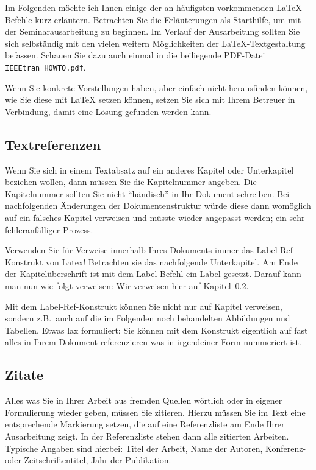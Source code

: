 \documentclass[a4paper,twoside]{IEEEtran}
\begin{document}
Im Folgenden möchte ich Ihnen einige der an häufigsten vorkommenden LaTeX-Befehle kurz erläutern. Betrachten Sie die Erläuterungen als Starthilfe, um mit der Seminarausarbeitung zu beginnen. Im Verlauf der Ausarbeitung sollten Sie sich selbständig mit den vielen weitern Möglichkeiten der LaTeX-Textgestaltung befassen. Schauen Sie dazu auch einmal in die beiliegende PDF-Datei \texttt{IEEEtran\_HOWTO.pdf}.

Wenn Sie konkrete Vorstellungen haben, aber einfach nicht herausfinden können, wie Sie diese mit LaTeX setzen können, setzen Sie sich mit Ihrem Betreuer in Verbindung, damit eine Lösung gefunden werden kann.


\subsection{Textreferenzen}

Wenn Sie sich in einem Textabsatz auf ein anderes Kapitel oder Unterkapitel beziehen wollen, dann müssen Sie die Kapitelnummer angeben. Die Kapitelnummer sollten Sie nicht "`händisch"' in Ihr Dokument schreiben. Bei nachfolgenden Änderungen der Dokumentenstruktur würde diese dann womöglich auf ein falsches Kapitel verweisen und müsste wieder angepasst werden; ein sehr fehleranfälliger Prozess.

Verwenden Sie für Verweise innerhalb Ihres Dokuments immer das Label-Ref-Konstrukt von Latex! Betrachten sie das nachfolgende Unterkapitel. Am Ende der Kapitelüberschrift ist mit dem Label-Befehl ein Label gesetzt. Darauf kann man nun wie folgt verweisen: Wir verweisen hier auf Kapitel~\ref{mein_erstes_label}.

Mit dem Label-Ref-Konstrukt können Sie nicht nur auf Kapitel verweisen, sondern z.B.\ auch auf die im Folgenden noch behandelten Abbildungen und Tabellen. Etwas lax formuliert: Sie können mit dem Konstrukt eigentlich auf fast alles in Ihrem Dokument referenzieren was in irgendeiner Form nummeriert ist. 


\subsection{Zitate}\label{mein_erstes_label}

Alles was Sie in Ihrer Arbeit aus fremden Quellen wörtlich oder in eigener Formulierung wieder geben, müssen Sie zitieren. Hierzu müssen Sie im Text eine entsprechende Markierung setzen, die auf eine Referenzliste am Ende Ihrer Ausarbeitung zeigt. In der Referenzliste stehen dann alle zitierten Arbeiten. Typische Angaben sind hierbei: Titel der Arbeit, Name der Autoren, Konferenz- oder Zeitschriftentitel, Jahr der Publikation.
\end{document}
